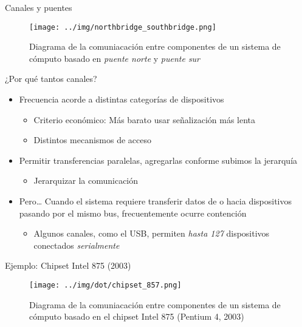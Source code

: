 \documentclass[presentation]{beamer}
\begin{document}
\begin{frame}[label={sec:orgb3c6d9a}]{Canales y puentes}
\begin{figure}[htbp]
\centering
\texttt{[image: ../img/northbridge\_southbridge.png]}
\caption{Diagrama de la comuniacación entre componentes de un sistema de cómputo basado en \emph{puente norte} y \emph{puente sur}}
\end{figure}
\end{frame}

\begin{frame}[label={sec:org17ec955}]{¿Por qué tantos canales?}
\begin{itemize}
\item Frecuencia acorde a distintas categorías de dispositivos
\begin{itemize}
\item Criterio económico: Más barato usar señalización más lenta
\item Distintos mecanismos de acceso
\end{itemize}
\item Permitir transferencias paralelas, agregarlas conforme subimos la
jerarquía
\begin{itemize}
\item Jerarquizar la comunicación
\end{itemize}
\item Pero\ldots{} Cuando el sistema requiere transferir datos de o hacia
dispositivos pasando por el mismo bus, frecuentemente ocurre
\alert{contención}
\begin{itemize}
\item Algunos canales, como el USB, permiten \emph{hasta 127} dispositivos
conectados \emph{serialmente}
\end{itemize}
\end{itemize}
\end{frame}

\begin{frame}[label={sec:org92e04db}]{Ejemplo: Chipset Intel 875 (2003)}
\begin{figure}[htbp]
\centering
\texttt{[image: ../img/dot/chipset\_857.png]}
\caption{Diagrama de la comuniacación entre componentes de un sistema de cómputo basado en el chipset Intel 875 (Pentium 4, 2003)}
\end{figure}
\end{frame}
\end{document}

